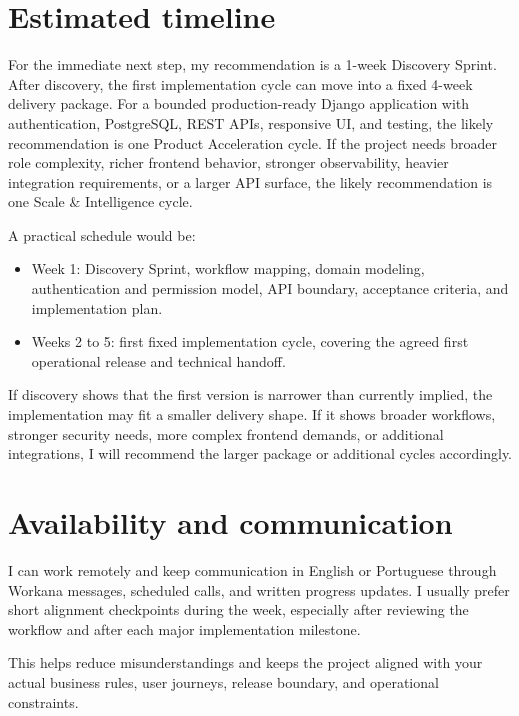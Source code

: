 \documentclass[11pt,a4paper]{article}
\begin{document}
\section*{Estimated timeline}

For the immediate next step, my recommendation is a 1-week Discovery Sprint. After discovery, the first implementation cycle can move into a fixed 4-week delivery package. For a bounded production-ready Django application with authentication, PostgreSQL, REST APIs, responsive UI, and testing, the likely recommendation is one Product Acceleration cycle. If the project needs broader role complexity, richer frontend behavior, stronger observability, heavier integration requirements, or a larger API surface, the likely recommendation is one Scale \& Intelligence cycle.\par

A practical schedule would be:\par

\begin{itemize}
\item Week 1: Discovery Sprint, workflow mapping, domain modeling, authentication and permission model, API boundary, acceptance criteria, and implementation plan.
\item Weeks 2 to 5: first fixed implementation cycle, covering the agreed first operational release and technical handoff.
\end{itemize}

If discovery shows that the first version is narrower than currently implied, the implementation may fit a smaller delivery shape. If it shows broader workflows, stronger security needs, more complex frontend demands, or additional integrations, I will recommend the larger package or additional cycles accordingly.\par

\section*{Availability and communication}

I can work remotely and keep communication in English or Portuguese through Workana messages, scheduled calls, and written progress updates. I usually prefer short alignment checkpoints during the week, especially after reviewing the workflow and after each major implementation milestone.\par

This helps reduce misunderstandings and keeps the project aligned with your actual business rules, user journeys, release boundary, and operational constraints.\par
\end{document}
